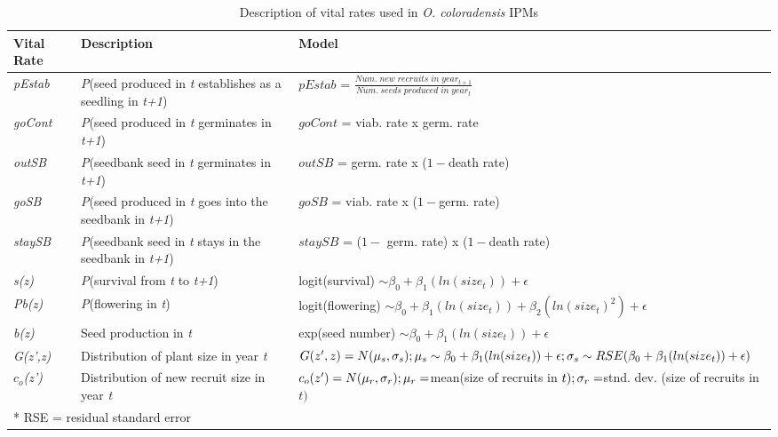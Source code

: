 \documentclass[12pt, letterpaper]{article}
\begin{document}
\begin{table}[h]
\centering
\begin{spacing}{1.3}
\caption{Description of vital rates used in \textit{O. coloradensis} IPMs\label{table:VitalRates}}
\begin{tabular}{p{}p{}p{}}
\toprule
Vital Rate & Description & Model \\
\hline
\rowcolor[gray]{.95} \textit{pEstab} & \small\textit{P}(seed produced in \textit{t} establishes as a seedling in \textit{t+1}) & $pEstab$ = $\frac{Num.\;new\;recruits\;in\;year_{t+1}}{Num.\;seeds\;produced\;in\;year_t}$\\

\textit{goCont} & \small \textit{P}(seed produced in \textit{t} germinates in \textit{t+1}) & $goCont$ = viab. rate \textsf{x} germ. rate\\
\rowcolor[gray]{.95} 
\textit{outSB} & \small\textit{P}(seedbank seed in \textit{t} germinates in \textit{t+1}) & $outSB$ = germ. rate \textsf{x} ($1 - $death rate)\\

\textit{goSB} & \small\textit{P}(seed produced in \textit{t} goes into the seedbank in \textit{t+1}) & $goSB$ = viab. rate \textsf{x} ($1 - $germ. rate)\\
\rowcolor[gray]{.95} 
\textit{staySB} & \small\textit{P}(seedbank seed in \textit{t} stays in the seedbank in \textit{t+1}) & $staySB$ = ($1-$ germ. rate) \textsf{x} ($1 - $death rate)\\
\textit{s(z)} & \small\textit{P}(survival from \textit{t} to \textit{t+1}) & logit(survival) $\sim \beta_0 + \beta_1 (ln(size_t)) + \epsilon$\\ 
\rowcolor[gray]{.95} 
\textit{Pb(z)} & \small\textit{P}(flowering in \textit{t}) & logit(flowering) $\sim \beta_0 + \beta_1 (ln(size_t)) + \beta_2 (ln(size_t)^2) + \epsilon$\\ 
\textit{b(z)} & \small Seed production in \textit{t} & exp(seed number) $\sim \beta_0 + \beta_1 (ln(size_t)) +  \epsilon$\\ 
\rowcolor[gray]{.95} 
\textit{G(z',z)} & \small Distribution of plant size in year \textit{t} & $G(z',z) = N(\mu_s, \sigma_s); \newline \mu_s \sim \beta_0 + \beta_1 (ln(size_t)) + \epsilon; \newline \sigma_s \sim RSE(\beta_0 + \beta_1 (ln(size_t)) + \epsilon)$\\ 
\textit{$c_o$(z')} & \small Distribution of new recruit size in year \textit{t} & $c_o(z') = N(\mu_r, \sigma_r); \newline \mu_r = $mean(size of recruits in $t); \newline \sigma_r = $stnd. dev. (size of recruits in $t)$\\
\hline
\multicolumn{3}{l}{* RSE = residual standard error} 
\end{tabular}
\end{spacing}
\end{table}
\end{document}
